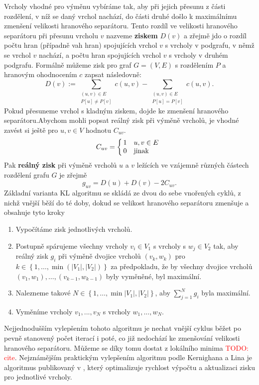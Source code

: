 \documentclass[11pt,american,czech,oneside]{book}
\theoremstyle{plain}
\theoremstyle{definition}
\newcommand{\TODO}[1]{\textcolor{red}{TODO: #1}\PackageWarning{TODO:}{TODO: #1!}}
\begin{document}
Vrcholy vhodné pro výměnu vybíráme tak, aby při jejich přesunu z části rozdělení, v níž se daný vrchol nachází, do části druhé došlo k maximálnímu zmenšení velikosti hranového separátoru. Tento rozdíl ve velikosti hranového separátoru při přesunu vrcholu $v$ nazveme \textbf{ziskem} $D(v)$ a zřejmě jdo o rozdíl počtu hran (případně vah hran) spojujících vrchol $v$ s vrcholy v podgrafu, v němž se vrchol $v$ nachází, a počtu hran spojujících vrchol $v$ s vrcholy v druhém podgrafu. Formálně můžeme zisk pro graf $G=(V,E)$ s rozdělením $P$ a hranovým ohodnocením $c$ zapsat následovně:
\[
D(v) := \sum\limits_{\substack{(u,v) \in E \\ P[u] \neq P[v]}}c(u,v) - \sum\limits_{\substack{(u,v) \in E \\ P[u] = P[v]}}c(u,v).
\]
Pokud přesuneme vrchol s kladným ziskem, dojde ke zmenšení hranového separátoru.Abychom mohli popsat reálný zisk při výměně vrcholů, je vhodné zavést si ještě pro $u,v \in V$ hodnotu $C_{uv}$.
\[
C_{uv}=
    \left\{
    \begin{array}{@{\,}ll}
		1  & \mbox{} {u,v} \in E\\
		0 & \mbox{jinak}
	\end{array}
\right.
\]
Pak \textbf{reálný zisk} při výměně vrcholů $u$ a $v$ ležících ve vzájemně různých částech rozdělení grafu $G$ je zřejmě
\[
g_{uv}=D(u)+D(v)-2C_{uv}.
\]
Základní varianta KL algoritmu se skládá ze dvou do sebe vnořených cyklů, z nichž vnější běží do té doby, dokud se velikost hranového separátoru zmenšuje a obsahuje tyto kroky
\begin{enumerate}
  \item Vypočítáme zisk jednotlivých vrcholů.
  \item Postupně spárujeme všechny vrcholy $v_i \in V_1$ s vrcholy s $w_j \in V_2$ tak, aby reálný zisk $g_i$ při výměně dvojice vrcholů $(v_k,w_k)$ pro $k \in \left\{1,\ldots,\min(|V_1|,|V_2|)\right\}$ za předpokladu, že by všechny dvojice vrcholů $(v_1,w_1),\ldots,(v_{k-1},w_{k-1})$ byly vyměněné, byl maximální.
  \item Nalezneme takové $N \in \left\{1,\ldots,\min{|V_1|,|V_2|}\right\}$, aby $\sum_{j=1}^{N}g_i$ byla maximální.
  \item Vyměníme vrcholy $v_1,...,v_N$ s vrcholy $w_1,...,w_N$.
\end{enumerate}

Nejjednodušším vylepšením tohoto algoritmu je nechat vnější cyklus běžet po pevně stanovený počet iterací i poté, co již nedochází ke zmenšování velikosti hranového separátoru. Můžeme se díky tomu dostat z lokálního minima \TODO{cite}. Nejznámějším praktickým vylepšením algoritmu podle Kernighana a Lina je algoritmus publikovaný v \cite{fima:89}, který optimalizuje rychlost výpočtu a aktualizaci zisku pro jednotlivé vrcholy.
\end{document}
